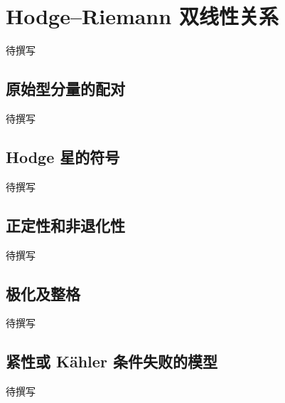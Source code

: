 
% 
% 
% 

\section{Hodge–Riemann 双线性关系}
\label{g4:sec:1706}

待撰写

\subsection{原始型分量的配对}
\label{g4:subsec:1706:01}
待撰写

\subsection{Hodge 星的符号}
\label{g4:subsec:1706:02}
待撰写

\subsection{正定性和非退化性}
\label{g4:subsec:1706:03}
待撰写

\subsection{极化及整格}
\label{g4:subsec:1706:04}
待撰写

\subsection{紧性或 Kähler 条件失败的模型}
\label{g4:subsec:1706:05}
待撰写

